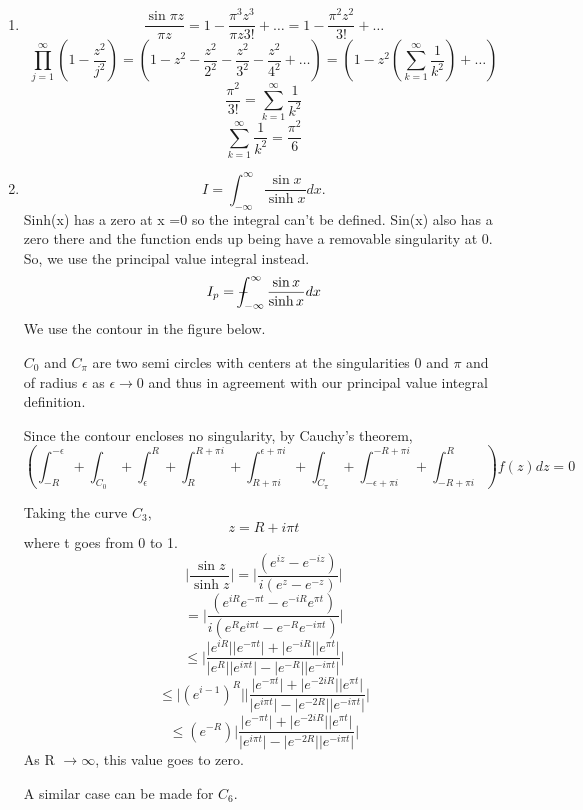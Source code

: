 \documentclass[a4paper]{article}
\def\Xint#1{\mathchoice
	{\XXint\displaystyle\textstyle{#1}}%
	{\XXint\textstyle\scriptstyle{#1}}%
	{\XXint\scriptstyle\scriptscriptstyle{#1}}%
	{\XXint\scriptscriptstyle\scriptscriptstyle{#1}}%
	\!\int}
\def\XXint#1#2#3{{\setbox0=\hbox{$#1{#2#3}{\int}$}
		\vcenter{\hbox{$#2#3$}}\kern-.5\wd0}}
\def\dashint{\Xint-}
\begin{document}
\begin{enumerate}
\item
\[
\frac{\sin \pi z}{\pi z}=1-\frac{\pi^3 z^3}{\pi z 3!} +\ldots=1-\frac{\pi^2 z^2}{ 3!} +\ldots
\]
\[\prod_{j=1}^\infty
\left(1-\frac{z^2}{j^2}\right) = \left(1 -z^2-\frac{z^2}{2^2}-\frac{z^2}{3^2}-\frac{z^2}{4^2} +\ldots \right) = \left(1  -z^2\left(\sum_{k=1}^\infty \frac{1}{k^2}\right) +\ldots \right) \]
\[ \frac{\pi^2}{3!}=\sum_{k=1}^\infty \frac{1}{k^2}\]
\[ \sum_{k=1}^\infty \frac{1}{k^2}=\frac{\pi^2}{6}\]
\item 
\[
I=\int_{-\infty}^\infty \frac{\sin x}{\sinh x}dx.
\]
Sinh(x) has a zero at x =0 so the integral can't be defined. Sin(x) also has a zero there and the function ends up being have a removable singularity at 0. So, we use the principal value integral instead.
\[I_p =\dashint_{-\infty}^\infty  \frac{\sin x}{\sinh x}dx\]
 We use the contour in the figure below.
 
 \vspace{100 mm}
 $C_0$ and $C_{\pi}$ are two semi circles with centers at the singularities 0 and $\pi$ and of radius $\epsilon$  as $ \epsilon \to 0 $ and thus in agreement with our principal value integral definition.
 
 Since the contour encloses no singularity, by Cauchy's theorem,
 \[\left(\int_{-R}^{-\epsilon} +\int_{C_0}+\int_{\epsilon}^{R} +\int_{R}^{R+\pi i}+\int_{R+\pi i}^{\epsilon+\pi i } +\int_{C_{\pi}} +\int_{-\epsilon+\pi i}^{-R+\pi i}+\int_{-R+\pi i}^{R}\right) f(z)dz= 0\]
 
 Taking the curve $C_3$,
 \[z = R+ i\pi t\]
 where t goes from 0 to 1.
 \[\Big\lvert\frac{\sin z}{\sinh z}\Big\rvert = \Big\lvert\frac{(e^{iz}-e^{-iz})}{i(e^{z}-e^{-z})}\Big\rvert\]
 \[  =\Big\lvert\frac{(e^{iR}e^{-\pi t}-e^{-iR}e^{\pi t})}{i(e^{R}e^{i \pi t}-e^{-R}e^{-i \pi t})}\Big\rvert \]
  \[  \leq \Big\lvert\frac{\lvert e^{iR}\rvert\lvert e^{-\pi t}\rvert+\lvert e^{-iR}\rvert\lvert e^{\pi t}\rvert}{\lvert e^{R}\rvert\lvert e^{i\pi t}\rvert-\lvert e^{-R}\rvert\lvert e^{-i\pi t}\rvert}\Big\rvert \]
  \[  \leq \lvert (e^{i-1})^R\rvert\Big\lvert\frac{\lvert e^{-\pi t}\rvert+\lvert e^{-2iR}\rvert\lvert e^{\pi t}\rvert}{\lvert e^{i\pi t}\rvert-\lvert e^{-2R}\rvert\lvert e^{-i\pi t}\rvert}\Big\rvert \]  
    \[  \leq  (e^{-R})\Big\lvert\frac{\lvert e^{-\pi t}\rvert+\lvert e^{-2iR}\rvert\lvert e^{\pi t}\rvert}{\lvert e^{i\pi t}\rvert-\lvert e^{-2R}\rvert\lvert e^{-i\pi t}\rvert}\Big\rvert \] 
  As R $\to \infty $, this value goes to zero.
  
  A similar case can be made for $C_6$.
  

\end{enumerate}
\end{document}
